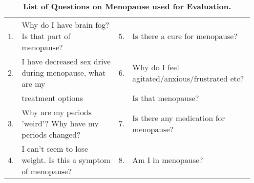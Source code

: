 \begin{table}[htp]
\fontsize{7}{8}\selectfont
\begin{tabular}{ll|ll}
\toprule

1.  & Why do I have brain fog? Is that part of menopause? & 5.  & Is there a cure for menopause?\\ 
2. & I have decreased sex drive during menopause, what are my & 6. & Why do I feel agitated/anxious/frustrated etc?
\\ & treatment options & & Is that menopause? \\ 
3.  & Why are my periods 'weird'? Why have my periods changed? & 7. & Is there any medication for menopause?  \\ 
4.  & I can't seem to lose weight. Is this a symptom of menopause? & 8. & Am I in menopause?\\ 

\bottomrule
  \end{tabular}\\
 \caption{\textbf{List of Questions on Menopause used for Evaluation.}}
  \label{tab:que}
\end{table}

